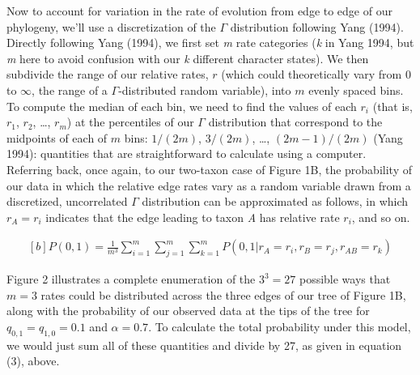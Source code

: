 \documentclass[fleqn,10pt,lineno]{wlpeerj} %
\begin{document}
Now to account for variation in the rate of evolution from edge to edge of our phylogeny, we'll use a discretization of the \(\Gamma\) distribution following Yang (1994). Directly following Yang (1994), we first set \emph{m} rate categories (\emph{k} in Yang 1994, but \emph{m} here to avoid confusion with our \emph{k} different character states). We then subdivide the range of our relative rates, \(r\) (which could theoretically vary from 0 to \(\infty\), the range of a \(\Gamma\)-distributed random variable), into \(m\) evenly spaced bins. To compute the median of each bin, we need to find the values of each \(r_{i}\) (that is, \(r_{1}\), \(r_{2}\), \ldots, \(r_{m}\)) at the percentiles of our \(\Gamma\) distribution that correspond to the midpoints of each of \(m\) bins: \(1/(2m)\), \(3/(2m)\), \ldots, \((2m - 1)/(2m)\) (Yang 1994): quantities that are straightforward to calculate using a computer. Referring back, once again, to our two-taxon case of Figure 1B, the probability of our data in which the relative edge rates vary as a random variable drawn from a discretized, uncorrelated \(\Gamma\) distribution can be approximated as follows, in which \(r_{A}=r_{i}\) indicates that the edge leading to taxon \emph{A} has relative rate \(r_{i}\), and so on.

\begin{equation}
\begin{aligned}[b]
P(0,1) = \frac{1}{m^3} \displaystyle\sum_{i=1}^{m} \displaystyle\sum_{j=1}^{m} \displaystyle\sum_{k=1}^{m} P(0,1|r_{A}=r_{i},r_{B}=r_{j},r_{AB}=r_{k})
\end{aligned}
\end{equation}

Figure 2 illustrates a complete enumeration of the \(3^3 = 27\) possible ways that \(m = 3\) rates could be distributed across the three edges of our tree of Figure 1B, along with the probability of our observed data at the tips of the tree for \(q_{0,1} = q_{1,0} = 0.1\) and \(\alpha = 0.7\). To calculate the total probability under this model, we would just sum all of these quantities and divide by 27, as given in equation (3), above.
\end{document}
